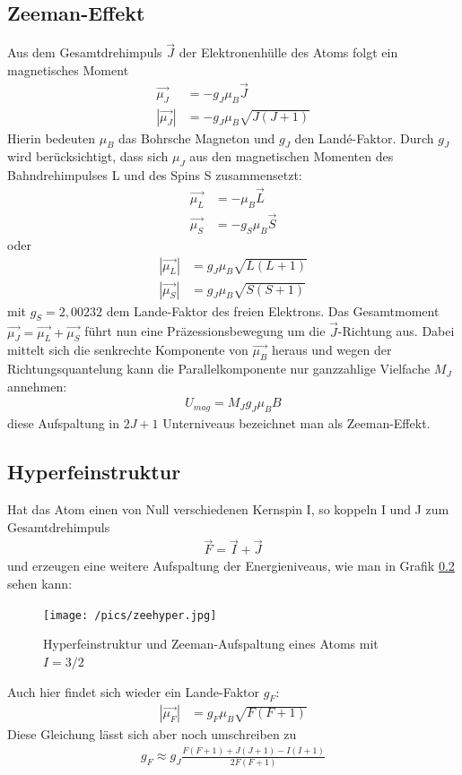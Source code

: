 \subsection{Zeeman-Effekt}
Aus dem Gesamtdrehimpuls $\vec{J}$ der Elektronenhülle des Atoms folgt ein magnetisches Moment
\begin{align*}
\vec{\mu_J}&=-g_J \mu_B \vec{J}\\
|\vec{\mu_J}|&=-g_J \mu_B \sqrt{J(J+1)}
\end{align*}
Hierin bedeuten $\mu_B$ das Bohrsche Magneton und $g_J$ den Landé-Faktor. Durch $g_J$ wird berücksichtigt, dass sich $\mu_J$ aus den magnetischen Momenten des Bahndrehimpulses L und des Spins S zusammensetzt:
\begin{align*}
\vec{\mu_L} &= -\mu_B \vec{L}\\
\vec{\mu_S} &= -g_S \mu_B \vec{S}
\end{align*}
oder
\begin{align*}
|\vec{\mu_L}|&=g_J \mu_B \sqrt{L(L+1)}\\
|\vec{\mu_S}|&=g_J \mu_B \sqrt{S(S+1)}
\end{align*}
mit $g_S = 2,00232$ dem Lande-Faktor des freien Elektrons. Das Gesamtmoment $\vec{\mu_J} = \vec{\mu_L}+\vec{\mu_S}$ führt nun eine Präzessionsbewegung um die $\vec{J}$-Richtung aus. Dabei mittelt sich die senkrechte Komponente von $\vec{\mu_B}$ heraus und wegen der Richtungsquantelung kann die Parallelkomponente nur ganzzahlige Vielfache $M_J$ annehmen:
\begin{align}
U_{mag}= M_Jg_J \mu_B B
\end{align}
diese Aufspaltung in $2J+1$ Unterniveaus bezeichnet man als Zeeman-Effekt.

\subsection{Hyperfeinstruktur}
Hat das Atom einen von Null verschiedenen Kernspin I, so koppeln I und J zum Gesamtdrehimpuls
\begin{align*}
\vec{F}=\vec{I}+\vec{J}
\end{align*}
und erzeugen eine weitere Aufspaltung der Energieniveaus, wie man in Grafik \ref{} sehen kann:
\begin{figure}[h]
\texttt{[image: /pics/zeehyper.jpg]}
\caption{Hyperfeinstruktur und Zeeman-Aufspaltung eines Atoms mit $I=3/2$}
\end{figure}
Auch hier findet sich wieder ein Lande-Faktor $g_F$:
\begin{align*}
|\vec{\mu_F}|&=g_F \mu_B \sqrt{F(F+1)}
\end{align*}
Diese Gleichung lässt sich aber noch umschreiben zu
\begin{align}
g_F\approx g_J \frac{F(F+1)+J(J+1)-I(I+1)}{2F(F+1)}
\end{align}

